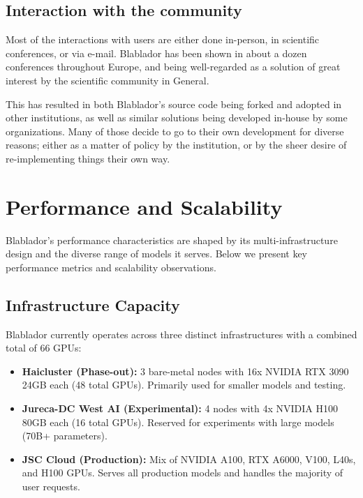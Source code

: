 \documentclass[10pt,conference]{IEEEtran}
\begin{document}
\subsection{Interaction with the community}

    Most of the interactions with users are either done in-person, in scientific conferences, or via e-mail. Blablador has been shown in about a dozen conferences throughout Europe, and being well-regarded as a solution of great interest by the scientific community in General. 

    This has resulted in both Blablador's source code being forked and adopted in other institutions, as well as similar solutions being developed in-house by some organizations. Many of those decide to go to their own development for diverse reasons; either as a matter of policy by the institution, or by the sheer desire of re-implementing things their own way.


\section{Performance and Scalability}

Blablador's performance characteristics are shaped by its multi-infrastructure design and the diverse range of models it serves. Below we present key performance metrics and scalability observations.

\subsection{Infrastructure Capacity}

Blablador currently operates across three distinct infrastructures with a combined total of 66 GPUs:

\begin{itemize}
    \item \textbf{Haicluster (Phase-out):} 3 bare-metal nodes with 16x NVIDIA RTX 3090 24GB each (48 total GPUs). Primarily used for smaller models and testing.
    \item \textbf{Jureca-DC West AI (Experimental):} 4 nodes with 4x NVIDIA H100 80GB each (16 total GPUs). Reserved for experiments with large models (70B+ parameters).
    \item \textbf{JSC Cloud (Production):} Mix of NVIDIA A100, RTX A6000, V100, L40s, and H100 GPUs. Serves all production models and handles the majority of user requests.
\end{itemize}
\end{document}
